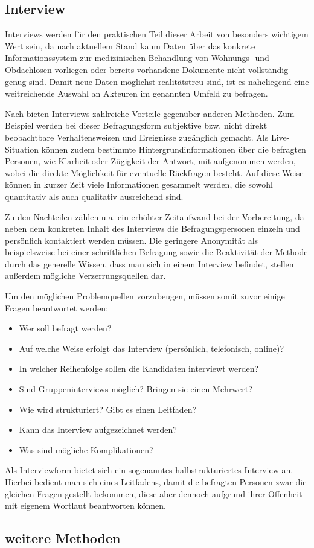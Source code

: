 \subsection{Interview}

Interviews werden für den praktischen Teil dieser Arbeit von besonders wichtigem Wert sein, da nach aktuellem Stand kaum Daten über das konkrete Informationssystem zur medizinischen Behandlung von Wohnungs- und Obdachlosen vorliegen oder bereits vorhandene Dokumente nicht vollständig genug sind. Damit neue Daten möglichst realitätstreu sind, ist es naheliegend eine weitreichende Auswahl an Akteuren im genannten Umfeld zu befragen.

Nach \citet{Doering.2015} bieten Interviews zahlreiche Vorteile gegenüber anderen Methoden. Zum Beispiel werden bei dieser Befragungsform subjektive bzw. nicht direkt beobachtbare Verhaltensweisen und Ereignisse zugänglich gemacht. Als Live-Situation können zudem bestimmte Hintergrundinformationen über die befragten Personen, wie Klarheit oder Zügigkeit der Antwort, mit aufgenommen werden, wobei die direkte Möglichkeit für eventuelle Rückfragen besteht. Auf diese Weise können in kurzer Zeit viele Informationen gesammelt werden, die sowohl quantitativ als auch qualitativ ausreichend sind.

Zu den Nachteilen zählen u.a. ein erhöhter Zeitaufwand bei der Vorbereitung, da neben dem konkreten Inhalt des Interviews die Befragungspersonen einzeln und persönlich kontaktiert werden müssen. Die geringere Anonymität als beispielsweise bei einer schriftlichen Befragung sowie die Reaktivität der Methode durch das generelle Wissen, dass man sich in einem Interview befindet, stellen außerdem mögliche Verzerrungsquellen dar.

Um den möglichen Problemquellen vorzubeugen, müssen somit zuvor einige Fragen beantwortet werden:
\begin{itemize}
	\item Wer soll befragt werden?
	\item Auf welche Weise erfolgt das Interview (persönlich, telefonisch, online)?
	\item In welcher Reihenfolge sollen die Kandidaten interviewt werden?
	\item Sind Gruppeninterviews möglich? Bringen sie einen Mehrwert?
	\item Wie wird strukturiert? Gibt es einen Leitfaden?
	\item Kann das Interview aufgezeichnet werden?
	\item Was sind mögliche Komplikationen?
\end{itemize}

Als Interviewform bietet sich ein sogenanntes halbstrukturiertes Interview an. Hierbei bedient man sich eines Leitfadens, damit die befragten Personen zwar die gleichen Fragen gestellt bekommen, diese aber dennoch aufgrund ihrer Offenheit mit eigenem Wortlaut beantworten können.

\subsection{weitere Methoden}

